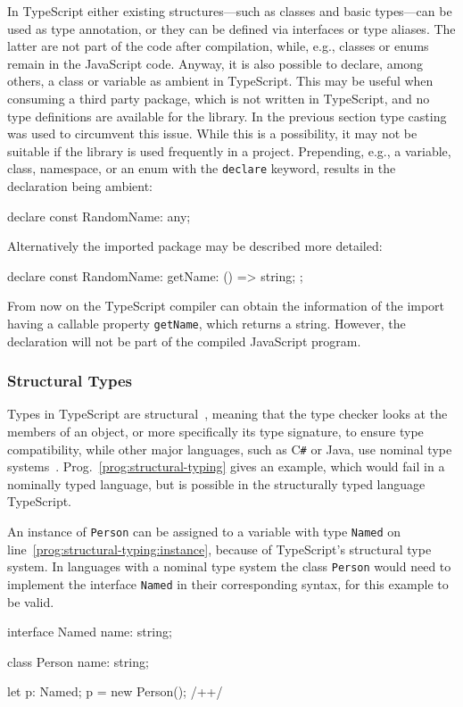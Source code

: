 In TypeScript either existing structures---such as classes and basic types---can be used as type annotation, or they can be defined via interfaces or type aliases. The latter are not part of the code after compilation, while, e.g., classes or enums remain in the JavaScript code. Anyway, it is also possible to declare, among others, a class or variable as ambient in TypeScript. This may be useful when consuming a third party package, which is not written in TypeScript, and no type definitions are available for the library. In the previous section type casting was used to circumvent this issue. While this is a possibility, it may not be suitable if the library is used frequently in a project. Prepending, e.g., a variable, class, namespace, or an enum with the \texttt{declare} keyword, results in the declaration being ambient:
\begin{JsCode}[numbers=none]
declare const RandomName: any;
\end{JsCode}
\pagebreak
Alternatively the imported package may be described more detailed:
\begin{JsCode}[numbers=none]
declare const RandomName: {
  getName: () => string;
};
\end{JsCode}
From now on the TypeScript compiler can obtain the information of the import having a callable property \texttt{getName}, which returns a string. However, the declaration will not be part of the compiled JavaScript program.

\enlargethispage{1\baselineskip}
\subsubsection{Structural Types}

Types in TypeScript are structural~\cite[p.~11]{TypeScriptBook:Syed:2017}, meaning that the type checker looks at the members of an object, or more specifically its type signature, to ensure type compatibility, while other major languages, such as C\texttt{\#} or Java, use nominal type systems~\cite{TypeScriptHandbook:TypeCompatibility}. Prog.~\ref{prog:structural-typing} gives an example, which would fail in a nominally typed language, but is possible in the structurally typed language TypeScript.

\begin{program}[h]
\caption{An instance of \texttt{Person} can be assigned to a variable with type \texttt{Named} on line~\ref{prog:structural-typing:instance}, because of TypeScript's structural type system. In languages with a nominal type system the class \texttt{Person} would need to implement the interface \texttt{Named} in their corresponding syntax, for this example to be valid.~\cite{TypeScriptHandbook:TypeCompatibility}}
\label{prog:structural-typing}
\begin{JsCode}
interface Named {
    name: string;
}

class Person {
    name: string;
}

let p: Named;
p = new Person(); /+\label{prog:structural-typing:instance}+/
\end{JsCode}
\end{program}

